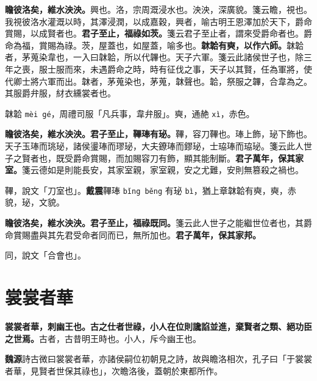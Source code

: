 \textbf{瞻彼洛矣，維水泱泱。}{\footnotesize 興也。洛，宗周溉浸水也。泱泱，深廣貌。箋云瞻，視也。我視彼洛水灌溉以時，其澤浸潤，以成嘉穀，興者，喻古明王恩澤加於天下，爵命賞賜，以成賢者也。}\textbf{君子至止，福祿如茨。}{\footnotesize 箋云君子至止者，謂來受爵命者也。爵命為福，賞賜為祿。茨，屋蓋也，如屋蓋，喻多也。}\textbf{韎韐有奭，以作六師。}{\footnotesize 韎韐者，茅蒐染韋也，一入曰韎韐，所以代韠也。天子六軍。箋云此諸侯世子也，除三年之喪，服士服而來，未遇爵命之時，時有征伐之事，天子以其賢，任為軍將，使代卿士將六軍而出。韎者，茅蒐染也，茅蒐，韎聲也。韐，祭服之韠，合韋為之。其服爵弁服，䊷衣纁裳者也。}

\begin{quoting}韎韐 \texttt{mèi gé}，周禮司服「凡兵事，韋弁服」。奭，通赩 \texttt{xì}，赤色。\end{quoting}

\textbf{瞻彼洛矣，維水泱泱。君子至止，鞸琫有珌。}{\footnotesize 鞸，容刀鞸也。琫上飾，珌下飾也。天子玉琫而珧珌，諸侯璗琫而璆珌，大夫鐐琫而鏐珌，士珕琫而珕珌。箋云此人世子之賢者也，既受爵命賞賜，而加賜容刀有飾，顯其能制斷。}\textbf{君子萬年，保其家室。}{\footnotesize 箋云德如是則能長安，其家室親，家室親，安之尤難，安則無篡殺之禍也。}

\begin{quoting}鞸，說文「刀室也」。\textbf{戴震}鞸琫 \texttt{bǐng běng} 有珌 \texttt{bì}，猶上章韎韐有奭，奭，赤貌，珌，文貌。\end{quoting}

\textbf{瞻彼洛矣，維水泱泱。君子至止，福祿既同。}{\footnotesize 箋云此人世子之能繼世位者也，其爵命賞賜盡與其先君受命者同而已，無所加也。}\textbf{君子萬年，保其家邦。}

\begin{quoting}同，說文「合會也」。\end{quoting}

\section{裳裳者華}


\textbf{裳裳者華，刺幽王也。古之仕者世祿，小人在位則讒諂並進，棄賢者之類、絕功臣之世焉。}{\footnotesize 古者，古昔明王時也。小人，斥今幽王也。}

\begin{quoting}\textbf{魏源}詩古微曰裳裳者華，亦諸侯嗣位初朝見之詩，故與瞻洛相次，孔子曰「于裳裳者華，見賢者世保其祿也」，次瞻洛後，蓋朝於東都所作。\end{quoting}

